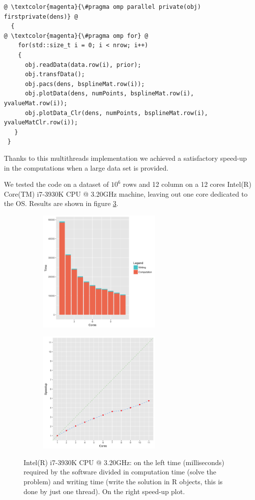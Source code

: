 \begin{lstlisting}
@ \textcolor{magenta}{\#pragma omp parallel private(obj) firstprivate(dens)} @
  {
@ \textcolor{magenta}{\#pragma omp for} @
    for(std::size_t i = 0; i < nrow; i++)
    {
      obj.readData(data.row(i), prior);
      obj.transfData();
      obj.pacs(dens, bsplineMat.row(i));
      obj.plotData(dens, numPoints, bsplineMat.row(i), yvalueMat.row(i));
      obj.plotData_Clr(dens, numPoints, bsplineMat.row(i), yvalueMatClr.row(i));
   }
 }
\end{lstlisting}

Thanks to this multithreads implementation we achieved a satisfactory speed-up in the computations when a large data set is provided.

We tested the code on a dataset of $10^{6}$ rows and 12 column on a 12 cores Intel(R) Core(TM) i7-3930K CPU @ 3.20GHz machine, leaving out one core dedicated to the OS. Results are shown in figure \ref{fig:giuspo12}.

\begin{figure}[ht]
	
	\begin{subfigure}{.5\textwidth}
		\includegraphics[width=6cm]{./pictures/openmp/giuspo12_time.png} 
		\label{fig:subim1}
	\end{subfigure}
	\begin{subfigure}{.5\textwidth}
		\includegraphics[width=6cm]{./pictures/openmp/giuspo12_speedup.png}
		\label{fig:subim2}
	\end{subfigure}
	
	\caption{Intel(R) i7-3930K CPU @ 3.20GHz: on the left time (milliseconds) required by the software divided in computation time (solve the problem) and writing time (write the solution in R objects, this is done by just one thread). On the right speed-up plot.}
	\label{fig:giuspo12}
	
\end{figure}


